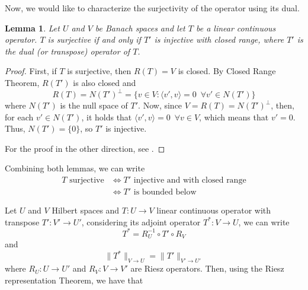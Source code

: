 \documentclass{article}
\newtheorem{lemma}{Lemma}
\begin{document}
Now, we would like to characterize the surjectivity of the operator using its dual.

\begin{lemma}
    Let \(U\) and \(V\) be Banach spaces and let \(T\) be a linear continuous 
    operator. \(T\) is surjective if and only if \(T'\) is injective with closed 
    range, where \(T'\) is the dual (or transpose) operator of \(T\).
\end{lemma}
\begin{proof}
    First, if \(T\) is surjective, then \(R(T) = V\) is closed. By Closed Range 
    Theorem, \(R(T')\) is also closed and 
    \begin{displaymath}
        R(T) = N(T')^\bot = 
        \{v\in V: \langle v', v\rangle = 0 \,\,\, \forall v' \in N(T')\}
    \end{displaymath}
    where \(N(T')\) is the null space of \(T'\). Now, since 
    \(V = R(T) = N(T')^\bot\), then, for each \(v' \in N(T')\), it holds
    that \( \langle v', v\rangle = 0\,\,\, \forall v \in V\), which means that 
    \(v' = 0\). Thus, \(N(T') = \{0\}\), so \(T'\) is injective.

    For the proof in the other direction, see \cite{chen2024infSup}. 
\end{proof}

Combining both lemmas, we can write
\begin{align*}
    T \text{ surjective}
    &\Longleftrightarrow T'\text{ injective and with closed range}
    \\&\Longleftrightarrow T'\text{ is bounded below}
\end{align*}

Let \(U\) and \(V\) Hilbert spaces and \(T:U\to V\) linear continuous operator
with transpose \(T':V'\to U'\), considering its adjoint operator \(T^*:V \to U\), 
we can write \[T^* = R_U^{-1} \circ T' \circ R_V\] and 
\[\lVert T^* \rVert_{V\to U} = \lVert T' \rVert_{V'\to U'}\] 
where \(R_U: U\to U'\) and 
\(R_V: V\to V'\) are Riesz operators. Then, using the Riesz representation 
Theorem, we have that
\end{document}
